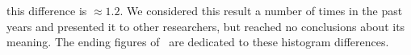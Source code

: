 																																																																																																																																																																																																																																																																																																																																																																																																				this difference is $\approx 1.2$.
																																																																																																																																																																																																																																																																																																																																																																																																				We considered this result a number of times in the past years and presented it to other researchers,
																																																																																																																																																																																																																																																																																																																																																																																																				but reached no conclusions about its meaning.
																																																																																																																																																																																																																																																																																																																																																																																																				The ending figures of~\cite{textTables} are dedicated to these histogram differences.

